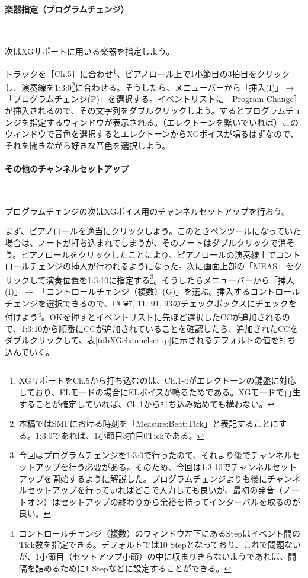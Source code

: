 \documentclass[uplatex, 10pt, dvipdfmx]{jsarticle}
\numberwithin{equation}{section}
\begin{document}
\paragraph{楽器指定（プログラムチェンジ）} \ 

次はXGサポートに用いる楽器を指定しよう。

トラックを［Ch.5］に合わせ\footnote{XGサポートをCh.5から打ち込むのは、Ch.1-4がエレクトーンの鍵盤に対応しており、ELモードの場合にELボイスが鳴るためである。XGモードで再生することが確定していれば、Ch.1から打ち込み始めても構わない。}、ピアノロール上で1小節目の3拍目をクリックし、演奏線を1:3:0\footnote{本稿ではSMFにおける時刻を「Measure:Beat:Tick」と表記することにする。1:3:0であれば、1小節目3拍目0Tickである。}に合わせる。そうしたら、メニューバーから「挿入(I)」$\rightarrow$ 「プログラムチェンジ(P)」を選択する。イベントリストに［Program Change］が挿入されるので、その文字列をダブルクリックしよう。するとプログラムチェンジを指定するウィンドウが表示される。（エレクトーンを繋いでいれば）このウィンドウで音色を選択するとエレクトーンからXGボイスが鳴るはずなので、それを聞きながら好きな音色を選択しよう。

\paragraph{その他のチャンネルセットアップ} \ 

プログラムチェンジの次はXGボイス用のチャンネルセットアップを行おう。

まず、ピアノロールを適当にクリックしよう。このときペンツールになっていた場合は、ノートが打ち込まれてしまうが、そのノートはダブルクリックで消そう。ピアノロールをクリックしたことにより、ピアノロールの演奏線上でコントロールチェンジの挿入が行われるようになった。次に画面上部の「MEAS」をクリックして演奏位置を1:3:10に指定する\footnote{今回はプログラムチェンジを1:3:0で行ったので、それより後でチャンネルセットアップを行う必要がある。そのため、今回は1:3:10でチャンネルセットアップを開始するように解説した。プログラムチェンジよりも後にチャンネルセットアップを行っていればどこで入力しても良いが、最初の発音（ノートオン）はセットアップの終わりから余裕を持ってインターバルを取るのが良い。}。そうしたらメニューバーから「挿入(I)」$\rightarrow$ 「コントロールチェンジ（複数）(G)」を選ぶ。挿入するコントロールチェンジを選択できるので、CC\texttt{\#}7, 11, 91, 93のチェックボックスにチェックを付けよう\footnote{コントロールチェンジ（複数）のウィンドウ左下にあるStepはイベント間のTick数を指定できる。デフォルトでは10 Stepとなっており、これで問題ないが、1小節目（セットアップ小節）の中に収まりきらないようであれば、間隔を詰めるために1 Stepなどに設定することができる。}。OKを押すとイベントリストに先ほど選択したCCが追加されるので、1:3:10から順番にCCが追加されていることを確認したら、追加されたCCをダブルクリックして、表\ref{tabXGchannelsetup}に示されるデフォルトの値を打ち込んでいく。
\end{document}
